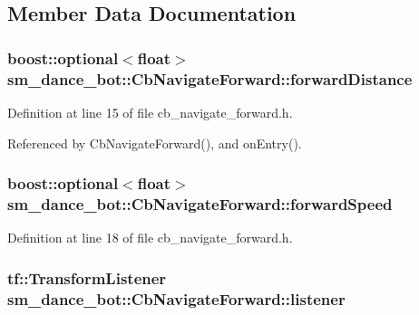 \subsection{Member Data Documentation}
\subsubsection[{\texorpdfstring{forward\+Distance}{forwardDistance}}]{\setlength{\rightskip}{0pt plus 5cm}boost\+::optional$<$float$>$ sm\+\_\+dance\+\_\+bot\+::\+Cb\+Navigate\+Forward\+::forward\+Distance}\hypertarget{classsm__dance__bot_1_1CbNavigateForward_a7aa9c05a79d2b0aa0f102ff06f579c07}{}\label{classsm__dance__bot_1_1CbNavigateForward_a7aa9c05a79d2b0aa0f102ff06f579c07}


Definition at line 15 of file cb\+\_\+navigate\+\_\+forward.\+h.



Referenced by Cb\+Navigate\+Forward(), and on\+Entry().

\subsubsection[{\texorpdfstring{forward\+Speed}{forwardSpeed}}]{\setlength{\rightskip}{0pt plus 5cm}boost\+::optional$<$float$>$ sm\+\_\+dance\+\_\+bot\+::\+Cb\+Navigate\+Forward\+::forward\+Speed}\hypertarget{classsm__dance__bot_1_1CbNavigateForward_af6cff0d1fe09327ce56d35154cf0eb25}{}\label{classsm__dance__bot_1_1CbNavigateForward_af6cff0d1fe09327ce56d35154cf0eb25}


Definition at line 18 of file cb\+\_\+navigate\+\_\+forward.\+h.

\subsubsection[{\texorpdfstring{listener}{listener}}]{\setlength{\rightskip}{0pt plus 5cm}tf\+::\+Transform\+Listener sm\+\_\+dance\+\_\+bot\+::\+Cb\+Navigate\+Forward\+::listener}\hypertarget{classsm__dance__bot_1_1CbNavigateForward_a7bda457757f10a2e71eb15c07bf707b4}{}\label{classsm__dance__bot_1_1CbNavigateForward_a7bda457757f10a2e71eb15c07bf707b4}


